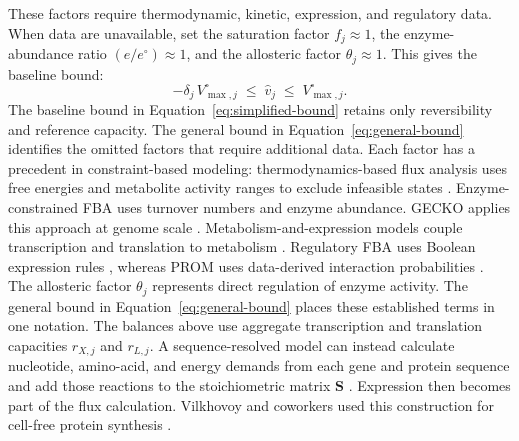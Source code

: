 These factors require thermodynamic, kinetic, expression, and regulatory
data. When data are unavailable, set the saturation factor $f_j\approx1$, the
enzyme-abundance ratio $(e/e^{\circ})\approx1$, and the allosteric factor
$\theta_j\approx1$. This gives the baseline bound:
\begin{equation}\label{eq:simplified-bound}
  -\delta_j\,V^{\circ}_{\max,j} \;\le\; \hat v_j \;\le\; V^{\circ}_{\max,j}.
\end{equation}
The baseline bound in Equation~\eqref{eq:simplified-bound} retains only
reversibility and reference capacity. The general bound in
Equation~\eqref{eq:general-bound} identifies the omitted factors that require
additional data. Each factor has a precedent in
constraint-based modeling: thermodynamics-based flux analysis uses free
energies and metabolite activity ranges to
exclude infeasible states \cite{Henry2007}. Enzyme-constrained FBA uses
turnover numbers and enzyme abundance. GECKO applies this approach at genome
scale \cite{Sanchez2017}. Metabolism-and-expression models couple
transcription and translation to metabolism \cite{OBrien2013}. Regulatory
FBA uses Boolean expression rules \cite{Covert2001}, whereas PROM uses
data-derived interaction probabilities \cite{Chandrasekaran2010}. The
allosteric factor $\theta_j$ represents direct regulation of enzyme
activity. The general bound in Equation~\eqref{eq:general-bound} places these
established terms in one notation. The balances above use aggregate transcription and
translation capacities $r_{X,j}$ and $r_{L,j}$. A sequence-resolved model can
instead calculate
nucleotide, amino-acid, and energy demands from each gene and protein
sequence and add those reactions to the stoichiometric matrix $\mathbf S$
\cite{AllenPalsson2003}.
Expression then becomes part of the flux calculation. Vilkhovoy and
coworkers used this construction for cell-free protein synthesis
\cite{Vilkhovoy2018}.
